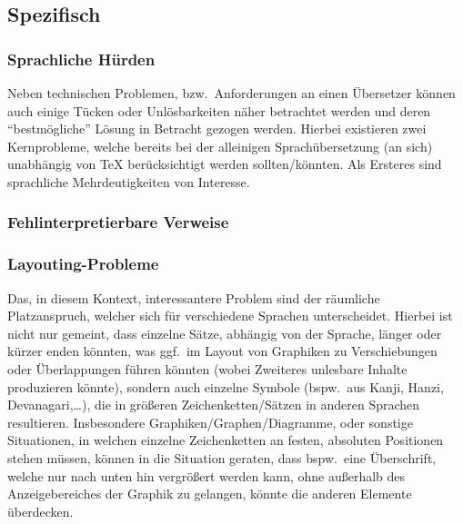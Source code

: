 \subsection{Spezifisch}
\subsubsection{Sprachliche Hürden}
Neben technischen Problemen, bzw.\ Anforderungen an einen Übersetzer können auch einige Tücken oder Unlösbarkeiten näher betrachtet werden und deren \enquote{bestmögliche} Lösung in Betracht gezogen werden. Hierbei existieren zwei Kernprobleme, welche bereits bei der alleinigen Sprachübersetzung (an sich) unabhängig von \TeX{} berücksichtigt werden sollten/könnten. Als Ersteres sind sprachliche Mehrdeutigkeiten von Interesse. 

\subsubsection{Fehlinterpretierbare Verweise}


\subsubsection{Layouting-Probleme}
Das, in diesem Kontext, interessantere Problem sind der räumliche Platzanspruch, welcher sich für verschiedene Sprachen unterscheidet. Hierbei ist nicht nur gemeint, dass einzelne Sätze, abhängig von der Sprache, länger oder kürzer enden könnten, was ggf.\ im Layout von Graphiken zu Verschiebungen oder Überlappungen führen könnten (wobei Zweiteres unlesbare Inhalte produzieren könnte), sondern auch einzelne Symbole (bspw.\ aus Kanji, Hanzi, Devanagari,\ldots), die in größeren Zeichenketten/Sätzen in anderen Sprachen resultieren. Insbesondere Graphiken/Graphen/Diagramme, oder sonstige Situationen, in welchen einzelne Zeichenketten an festen, absoluten Positionen stehen müssen, können in die Situation geraten, dass bspw.\ eine Überschrift, welche nur nach unten hin vergrößert werden kann, ohne außerhalb des Anzeigebereiches der Graphik zu gelangen, könnte die anderen Elemente überdecken. 




